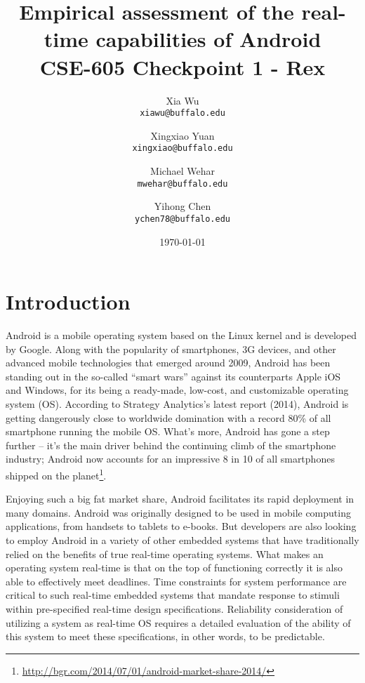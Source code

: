 \documentclass[11pt]{article}
\author{Xia Wu\\ \texttt{xiawu@buffalo.edu} \and Xingxiao Yuan\\ \texttt{xingxiao@buffalo.edu} \and Michael Wehar\\ \texttt{mwehar@buffalo.edu} \and Yihong Chen\\ \texttt{ychen78@buffalo.edu}}
\date{\today}
\title{Empirical assessment of the real-time capabilities of Android\\\large CSE-605 Checkpoint 1 - Rex}
\begin{document}
\maketitle
\tableofcontents


\section{Introduction}
\label{sec-1}
Android is a mobile operating system based on the Linux kernel and is developed by Google. Along with the popularity of smartphones, 3G devices, and other advanced mobile technologies that emerged around 2009, Android has been standing out in the so-called “smart wars” against its counterparts Apple iOS and Windows, for its being a ready-made, low-cost, and customizable operating system (OS). According to Strategy Analytics's latest report (2014), Android is getting dangerously close to worldwide domination with a record 80\% of all smartphone running the mobile OS. What’s more, Android has gone a step further – it’s the main driver behind the continuing climb of the smartphone industry; Android now accounts for an impressive 8 in 10 of all smartphones shipped on the planet\footnote{\url{http://bgr.com/2014/07/01/android-market-share-2014/}}.

Enjoying such a big fat market share, Android facilitates its rapid deployment in many domains. Android was originally designed to be used in mobile computing applications, from handsets to tablets to e-books. But developers are also looking to employ Android in a variety of other embedded systems that have traditionally relied on the benefits of true real-time operating systems. What makes an operating system real-time is that on the top of functioning correctly it is also able to effectively meet deadlines.  Time constraints for system performance are critical to such real-time embedded systems that mandate response to stimuli within pre-specified real-time design specifications. Reliability consideration of utilizing a system as real-time OS requires a detailed evaluation of the ability of this system to meet these specifications, in other words, to be predictable.
\end{document}
